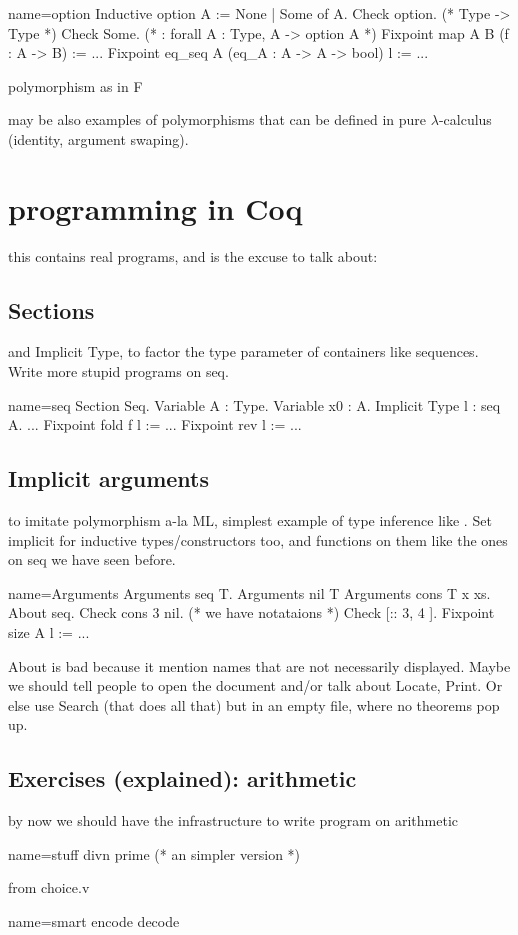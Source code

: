 \begin{coq}{name=option}{}
Inductive option A := None | Some of A.
Check option. (* Type -> Type *)
Check Some. (* : forall A : Type, A -> option A *)
Fixpoint map A B (f : A -> B) := ...
Fixpoint eq_seq A (eq_A : A -> A -> bool) l := ...
\end{coq}

polymorphism as in F

may be also examples of polymorphisms that can be defined in pure
$\lambda$-calculus (identity, argument swaping).

\section{programming in Coq}
this contains real programs, and is the excuse to talk about:

\subsection{Sections}
and Implicit Type, to factor the type parameter of containers like
sequences.  Write more stupid programs on seq.

\begin{coq}{name=seq}{}
Section Seq.
Variable A : Type.
Variable x0 : A.
Implicit Type l : seq A.
...
Fixpoint fold f l := ...
Fixpoint rev l := ...
\end{coq}


\subsection{Implicit arguments}
to imitate polymorphism a-la ML, simplest example of type inference
like .  Set implicit for inductive types/constructors too,
and functions on them like the ones on seq we have seen before.

\begin{coq}{name=Arguments}{}
Arguments seq {T}.
Arguments nil {T}
Arguments cons {T} x xs.
About seq.
Check cons 3 nil.
(* we have notataions *)
Check [:: 3, 4 ].
Fixpoint size A l := ...
\end{coq}

About is bad because it mention names that are not necessarily displayed.
Maybe we should tell people to open the document and/or talk about Locate,
Print.  Or else use Search (that does all that) but in an empty
file, where no theorems pop up.

\subsection{Exercises (explained): arithmetic}
by now we should have the infrastructure to write program on arithmetic

\begin{coq}{name=stuff}{}
divn
prime  (* an simpler version *)
\end{coq}

from choice.v

\begin{coq}{name=smart}{}
encode
decode
\end{coq}


